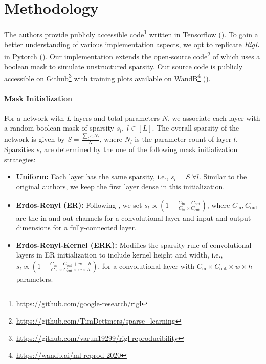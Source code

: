 \section{Methodology}


The authors provide publicly accessible code\footnote{\href{https://github.com/google-research/rigl}{https://github.com/google-research/rigl}} written in Tensorflow (\citet{abadi2016tensorflow}). To gain a better understanding of various implementation aspects, we opt to replicate \textit{RigL} in Pytorch (\citet{Pytorch}). Our implementation extends the open-source code\footnote{\href{https://github.com/TimDettmers/sparse_learning}{https://github.com/TimDettmers/sparse\_learning}} of \citet{dettmers2020sparse} which uses a boolean mask to simulate unstructured sparsity. Our source code is publicly accessible on Github\footnote{\href{https://github.com/varun19299/rigl-reproducibility}{https://github.com/varun19299/rigl-reproducibility}} with training plots available on WandB\footnote{\href{https://wandb.ai/ml-reprod-2020}{https://wandb.ai/ml-reprod-2020}} (\citet{wandb}).


\paragraph{Mask Initialization} For a network with $L$ layers and total parameters $N$, we associate each layer with a random boolean mask of sparsity $s_l, \; l \in [L]$. The overall sparsity of the network is given by $S=\frac{\sum_l s_l N_l}{N}$, where $N_l$ is the parameter count of layer $l$. Sparsities $s_l$ are determined by the one of the following mask initialization strategies:

\begin{itemize}
    \item \textbf{Uniform:} Each layer has the same sparsity, i.e., $s_l = S \; \forall l$. Similar to the original authors, we keep the first layer dense in this initialization.
    
    \item \textbf{Erdos-Renyi (ER):} Following \citet{Mocanu2018SET}, we set $s_l \propto \left(1 - \frac{C_\text{in} + C_\text{out}}{C_\text{in} \times C_\text{out}} \right)$, where $C_\text{in}, C_\text{out}$ are the in and out channels for a convolutional layer and input and output dimensions for a fully-connected layer. 
    
    \item \textbf{Erdos-Renyi-Kernel (ERK):} Modifies the sparsity rule of convolutional layers in ER initialization to include kernel height and width, i.e., $s_l \propto \left(1 - \frac{C_\text{in} + C_\text{out} + w + h}{C_\text{in} \times C_\text{out} \times w \times h} \right)$, for a convolutional layer with $C_\text{in} \times C_\text{out} \times w \times h$ parameters. 
\end{itemize}

